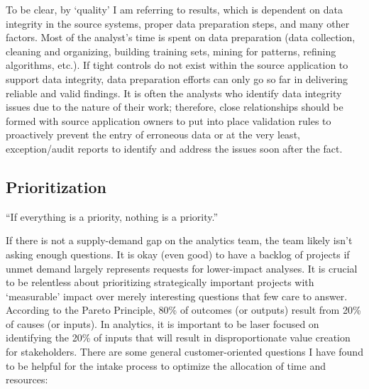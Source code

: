 \documentclass[]{book}
\begin{document}
To be clear, by `quality' I am referring to results, which is dependent on data integrity in the source systems, proper data preparation steps, and many other factors. Most of the analyst's time is spent on data preparation (data collection, cleaning and organizing, building training sets, mining for patterns, refining algorithms, etc.). If tight controls do not exist within the source application to support data integrity, data preparation efforts can only go so far in delivering reliable and valid findings. It is often the analysts who identify data integrity issues due to the nature of their work; therefore, close relationships should be formed with source application owners to put into place validation rules to proactively prevent the entry of erroneous data or at the very least, exception/audit reports to identify and address the issues soon after the fact.

\hypertarget{prioritization}{%
\subsection{Prioritization}\label{prioritization}}

``If everything is a priority, nothing is a priority.''

If there is not a supply-demand gap on the analytics team, the team likely isn't asking enough questions. It is okay (even good) to have a backlog of projects if unmet demand largely represents requests for lower-impact analyses. It is crucial to be relentless about prioritizing strategically important projects with `measurable' impact over merely interesting questions that few care to answer. According to the Pareto Principle, 80\% of outcomes (or outputs) result from 20\% of causes (or inputs). In analytics, it is important to be laser focused on identifying the 20\% of inputs that will result in disproportionate value creation for stakeholders. There are some general customer-oriented questions I have found to be helpful for the intake process to optimize the allocation of time and resources:
\end{document}
